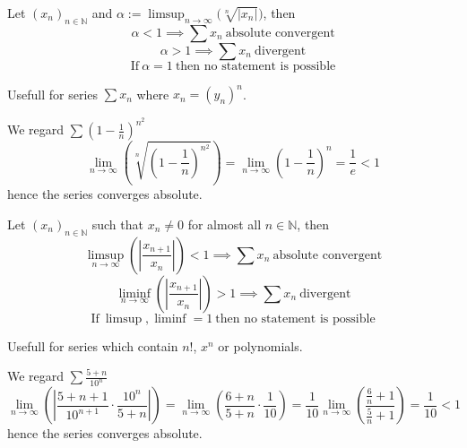 \begin{proposition}\label{pro:root_test}
   Let \((x_n)_{n \in \mathbb{N}}\) and \(\alpha := \limsup_{n \to \infty}\big(\sqrt[n]{|x_n|}\big)\), then
   \[\alpha < 1 \implies \sum x_n~\text{absolute convergent}\]
   \[\alpha > 1 \implies \sum x_n~\text{divergent}\]
   \[\text{If}~\alpha = 1~\text{then no statement is possible}\]
\end{proposition}
\begin{remark}[Tips]
   Usefull for series \(\sum x_n\) where \(x_n = (y_n)^n\).
\end{remark}
\begin{example}
   We regard \(\sum \left(1 - \frac{1}{n}\right)^{n^2}\)
   \[\lim_{n \to \infty}\left(\sqrt[n]{\left(1 - \frac{1}{n}\right)^{n^2}}\right) = \lim_{n \to \infty} \left(1 - \frac{1}{n}\right)^n = \frac{1}{e} < 1\]
   hence the series converges absolute.
\end{example}

\begin{proposition}\label{pro:ratio_test}
   Let \((x_n)_{n \in \mathbb{N}}\) such that \(x_n \neq 0\) for almost all \(n \in \mathbb{N}\), then
   \[\limsup_{n \to \infty} \left(\left|\frac{x_{n+1}}{x_n}\right|\right) < 1 \implies \sum x_n~\text{absolute convergent}\]
   \[\liminf_{n \to \infty} \left(\left|\frac{x_{n+1}}{x_n}\right|\right) > 1 \implies \sum x_n~\text{divergent}\]
   \[\text{If}~\limsup, \liminf = 1~\text{then no statement is possible}\]
\end{proposition}
\begin{remark}[Tips]
   Usefull for series which contain \(n!\), \(x^n\) or polynomials.
\end{remark}
\begin{example}
   We regard \(\sum \frac{5 + n}{10^n}\)
   \[\lim_{n \to \infty}\left(\left\lvert\frac{5 + n + 1}{10^{n+1}} \cdot \frac{10^n}{5 + n}\right\rvert\right) = \lim_{n \to \infty}\left(\frac{6+n}{5+n} \cdot \frac{1}{10}\right) = \frac{1}{10} \lim_{n \to \infty}\left(\frac{\frac{6}{n} + 1}{\frac{5}{n}+1}\right) = \frac{1}{10} < 1\]
   hence the series converges absolute.
\end{example}

